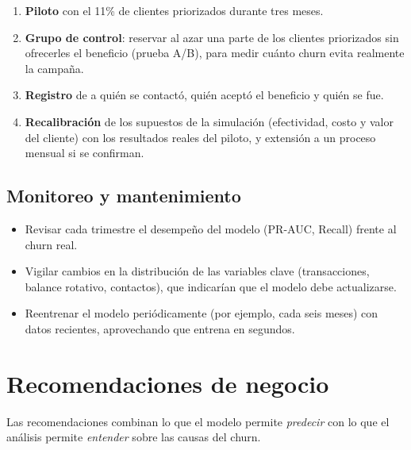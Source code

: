 \documentclass[11pt,a4paper]{article}
\begin{document}
\begin{enumerate}
  \item \textbf{Piloto} con el 11\% de clientes priorizados durante tres meses.
  \item \textbf{Grupo de control}: reservar al azar una parte de los clientes priorizados sin ofrecerles el beneficio (prueba A/B), para medir cuánto churn evita realmente la campaña.
  \item \textbf{Registro} de a quién se contactó, quién aceptó el beneficio y quién se fue.
  \item \textbf{Recalibración} de los supuestos de la simulación (efectividad, costo y valor del cliente) con los resultados reales del piloto, y extensión a un proceso mensual si se confirman.
\end{enumerate}

\subsection{Monitoreo y mantenimiento}

\begin{itemize}
  \item Revisar cada trimestre el desempeño del modelo (PR-AUC, Recall) frente al churn real.
  \item Vigilar cambios en la distribución de las variables clave (transacciones, balance rotativo, contactos), que indicarían que el modelo debe actualizarse.
  \item Reentrenar el modelo periódicamente (por ejemplo, cada seis meses) con datos recientes, aprovechando que entrena en segundos.
\end{itemize}

\section{Recomendaciones de negocio}
\label{sec:recomendaciones}

Las recomendaciones combinan lo que el modelo permite \emph{predecir} con lo que el análisis permite \emph{entender} sobre las causas del churn.
\end{document}
